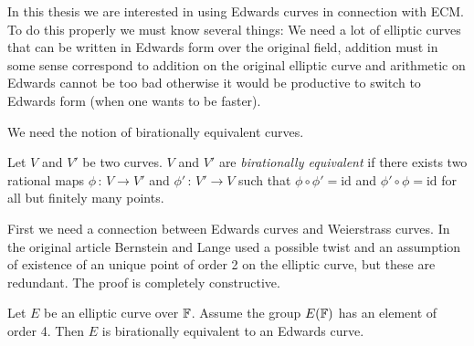 In this thesis we are interested in using Edwards curves in connection with ECM. To do this properly we must know several things: We need a lot of elliptic curves that can be written in Edwards form over the original field, addition must in some sense correspond to addition on the original elliptic curve and arithmetic on Edwards cannot be too bad otherwise it would be productive to switch to Edwards form (when one wants to be faster).

We need the notion of birationally equivalent curves. 
\begin{defn}\label{def:biratEqui}
Let $V$ and $V'$ be two curves. $V$ and $V'$ are \textit{birationally equivalent} if there exists two rational maps $\phi\,:\, V\rightarrow V'$ and $\phi'\,:\, V'\rightarrow V$ such that $\phi\circ\phi'=\text{id}$ and $\phi'\circ\phi=\text{id}$ for all but finitely many points.  
\end{defn}
First we need a connection between Edwards curves and Weierstrass curves. In the original article \cite{BL07} Bernstein and Lange used a possible twist and an assumption of existence of an unique point of order 2 on the elliptic curve, but these are redundant. The proof is completely constructive. 
\begin{thm}\label{thm:biratinal}
Let $E$ be an elliptic curve over $\mathbb{F}$. Assume the group $E(\mathbb{F})$ has an element of order 4. Then $E$ is birationally equivalent to an Edwards curve.  
\end{thm}
